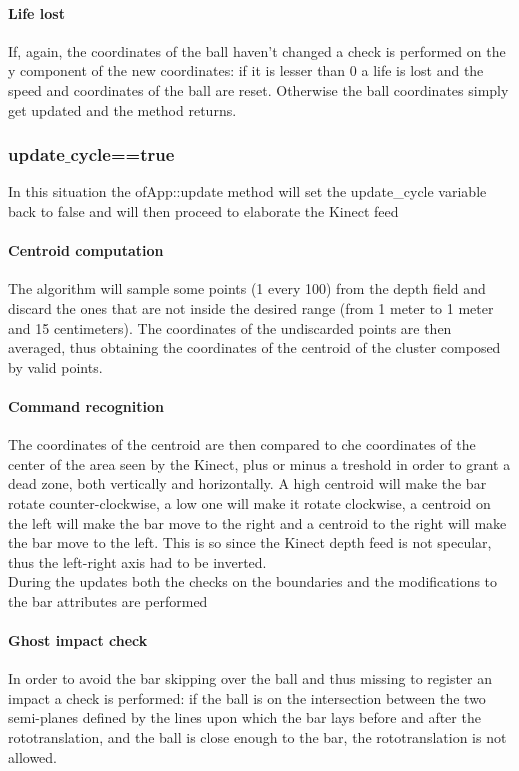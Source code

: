 \documentclass[]{article}
\begin{document}
\paragraph{Life lost}
If, again, the coordinates of the ball haven't changed a check is performed on the y component of the new coordinates: if it is lesser than 0 a life is lost and the speed and coordinates of the ball are reset. Otherwise the ball coordinates simply get updated and the method returns.    
\subsubsection{update$\_$cycle==true} 
In this situation the ofApp::update method will set the update\_cycle variable back to false and will then proceed to elaborate the Kinect feed
\paragraph{Centroid computation}
The algorithm will sample some points (1 every 100) from the depth field and discard the ones that are not inside the desired range (from 1 meter to 1 meter and 15 centimeters). The coordinates of the undiscarded points are then averaged, thus obtaining the coordinates of the centroid of the cluster composed by valid points.\\
\paragraph{Command recognition}
The coordinates of the centroid are then compared to che coordinates of the center of the area seen by the Kinect, plus or minus a treshold in order to grant a dead zone, both vertically and horizontally.
A high centroid will make the bar rotate counter-clockwise, a low one will make it rotate clockwise, a centroid on the left will make the bar move to the right and a centroid to the right will make the bar move to the left.
This is so since the Kinect depth feed is not specular, thus the left-right axis had to be inverted.\\
During the updates both the checks on the boundaries and the modifications to the bar attributes are performed
\paragraph{Ghost impact check}
In order to avoid the bar skipping over the ball and thus missing to register an impact a check is performed: if the ball is on the intersection between the two semi-planes defined by the lines upon which the bar lays before and after the rototranslation, and the ball is close enough to the bar, the rototranslation is not allowed.\\
\end{document}
